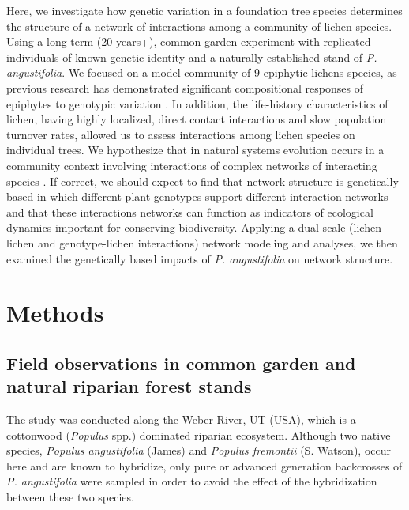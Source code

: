 \documentclass[fleqn,10pt]{wlscirep}
\begin{document}
Here, we investigate how genetic variation in a foundation tree
species determines the structure of a network of interactions among a
community of lichen species. Using a long-term (20 years+), common
garden experiment with replicated individuals of known genetic
identity and a naturally established stand of
\textit{P. angustifolia}. We focused on a model community of 9
epiphytic lichens species, as previous research has demonstrated
significant compositional responses of epiphytes to genotypic
variation \cite{Winfree2011, Zytynska2011}. In addition, the
life-history characteristics of lichen, having highly localized,
direct contact interactions and slow population turnover rates,
allowed us to assess interactions among lichen species on individual
trees. We hypothesize that in natural systems evolution occurs in a
community context involving interactions of complex networks of
interacting species \cite{Lau2016, Keith2017, Thompson2013,
  Bascompte2007, Darwin1855}.  If correct, we should expect to find
that network structure is genetically based in which different plant
genotypes support different interaction networks and that these
interactions networks can function as indicators of ecological
dynamics important for conserving biodiversity.  Applying a dual-scale
(lichen-lichen and genotype-lichen interactions) network modeling and
analyses, we then examined the genetically based impacts of
\textit{P. angustifolia} on network structure.


\section*{Methods}

\subsection*{Field observations in common garden and natural riparian forest stands}

The study was conducted along the Weber River, UT (USA), which is a
cottonwood (\textit{Populus} spp.) dominated riparian
ecosystem. Although two native species, \textit{Populus angustifolia}
(James) and \textit{Populus fremontii} (S. Watson), occur here and are
known to hybridize, only pure or advanced generation backcrosses of
\textit{P. angustifolia} were sampled in order to avoid the effect of
the hybridization between these two species.
\end{document}
